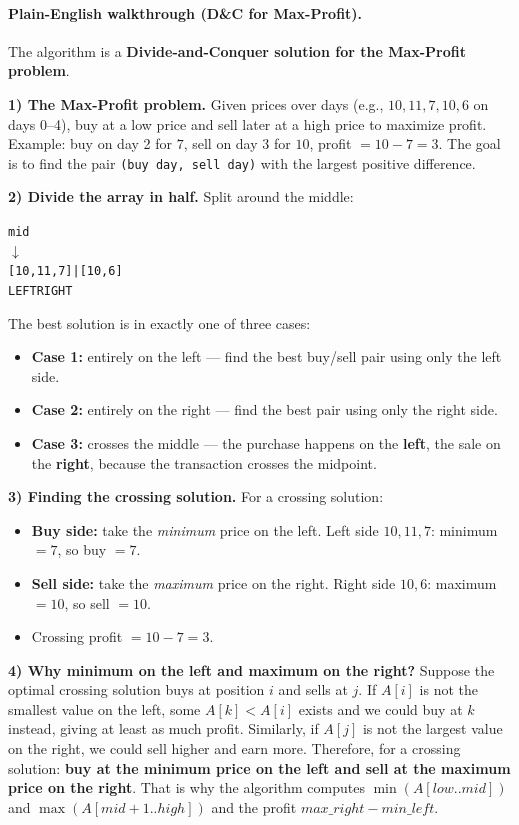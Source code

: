 \documentclass[11pt]{article}
\begin{document}
\paragraph{Plain-English walkthrough (D\&C for Max-Profit).}
The algorithm is a \textbf{Divide-and-Conquer solution for the Max-Profit problem}.

\textbf{1) The Max-Profit problem.} Given prices over days (e.g., $10, 11, 7, 10, 6$ on days
0--4), buy at a low price and sell later at a high price to maximize profit. Example: buy on
day 2 for $7$, sell on day 3 for $10$, profit $= 10 - 7 = 3$. The goal is to find the pair
\texttt{(buy day, sell day)} with the largest positive difference.

\textbf{2) Divide the array in half.} Split around the middle:
\begin{alltt}
         mid
          \(\downarrow\)
[10, 11, 7] | [10, 6]
   LEFT        RIGHT
\end{alltt}
The best solution is in exactly one of three cases:
\begin{itemize}
  \item \textbf{Case 1:} entirely on the left --- find the best buy/sell pair using only the left side.
  \item \textbf{Case 2:} entirely on the right --- find the best pair using only the right side.
  \item \textbf{Case 3:} crosses the middle --- the purchase happens on the \textbf{left}, the sale
        on the \textbf{right}, because the transaction crosses the midpoint.
\end{itemize}

\textbf{3) Finding the crossing solution.} For a crossing solution:
\begin{itemize}
  \item \textbf{Buy side:} take the \emph{minimum} price on the left. Left side $10, 11, 7$:
        minimum $= 7$, so buy $= 7$.
  \item \textbf{Sell side:} take the \emph{maximum} price on the right. Right side $10, 6$:
        maximum $= 10$, so sell $= 10$.
  \item Crossing profit $= 10 - 7 = 3$.
\end{itemize}

\textbf{4) Why minimum on the left and maximum on the right?}
Suppose the optimal crossing solution buys at position $i$ and sells at $j$. If $A[i]$ is not
the smallest value on the left, some $A[k] < A[i]$ exists and we could buy at $k$ instead,
giving at least as much profit. Similarly, if $A[j]$ is not the largest value on the right, we
could sell higher and earn more. Therefore, for a crossing solution: \textbf{buy at the minimum
price on the left and sell at the maximum price on the right}. That is why the algorithm
computes $\min(A[low..mid])$ and $\max(A[mid+1..high])$ and the profit
$\mathit{max\_right} - \mathit{min\_left}$.
\end{document}
